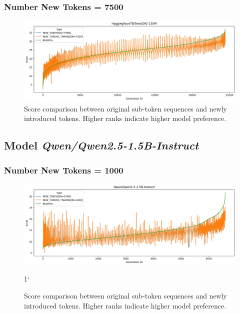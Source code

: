 \subsubsection{Number New Tokens = 7500}
\begin{figure}[H]
    \centering
    \includegraphics[width=\textwidth]{Figures/Appendix/token-rank-comparison_7500_smol135M.png}
    \caption[Score comparison for \textit{SmolLM2-135M} w/ 7500 new tokens]{Score comparison between original sub-token sequences and newly introduced tokens. Higher ranks indicate higher model preference.}
    \label{annex:fig:new_token_rank:7500_smol135M}
\end{figure}
\FloatBarrier


\subsection{Model \textit{Qwen/Qwen2.5-1.5B-Instruct}}

\subsubsection{Number New Tokens = 1000}
\begin{figure}[H]
    \centering
    \includegraphics[width=\textwidth]{Figures/Appendix/token-rank-comparison_1000_qwen.png}
    \caption[Score comparison for \textit{Qwen2.5-1.5B-Instruct} w/ 1000 new tokens]{Score comparison between original sub-token sequences and newly introduced tokens. Higher ranks indicate higher model preference.}1`
    \label{annex:fig:new_token_rank:1000_qwen}
\end{figure}
\FloatBarrier
